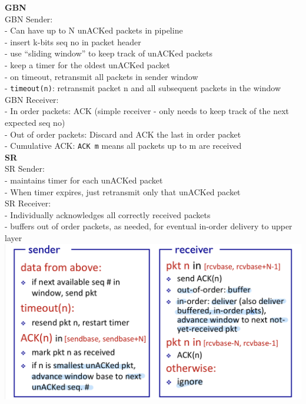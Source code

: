 \documentclass[10pt, a4paper]{article}
\newcommand{\blue}[1]{{\color{MidnightBlue}#1}}
\newcommand{\red}[1]{{\color{red}#1}}
\begin{document}
\begin{multicols*}{3}
		\textbf{GBN}\\
		GBN Sender:\\
		- Can have up to \blue{N unACKed packets} in pipeline\\
		- insert k-bits seq no in packet header\\
		- use ``sliding window'' to keep track of unACKed packets\\
		- keep a \blue{timer} for the \blue{oldest} unACKed packet\\
		- on timeout, retransmit all packets in sender window\\
		- \texttt{timeout(n)}: retransmit packet n and all subsequent packets in the window\\

		GBN Receiver:\\
		- \blue{In order packets}: ACK (simple receiver - only needs to keep track of the next expected seq no)\\
		- \blue{Out of order packets}: Discard and ACK the \blue{last in order packet}\\
		- \red{Cumulative ACK:} \texttt{ACK m} means all packets up to m are received\\

		\textbf{SR}\\
		SR Sender:\\
		- maintains timer for each unACKed packet\\
		- When timer expires, just retransmit \blue{only that unACKed packet}\\

		SR Receiver:\\
		- \red{Individually acknowledges} all correctly received packets\\
		- \blue{buffers out of order packets}, as needed, for eventual in-order delivery to upper layer\\
		\includegraphics[scale=.14]{./assets/selectiveRepeat}


\end{multicols*}
\end{document}
